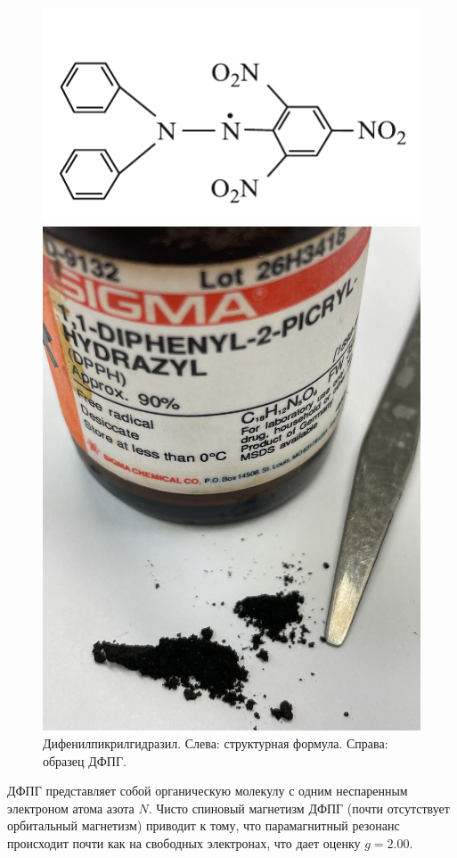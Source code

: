 \documentclass[a4paper, 12pt]{article} %
\begin{document}
	\begin{figure}[h!]
		\centering
		\begin{minipage}{0.6\textwidth}
			\centering
			\includegraphics[width=0.7\linewidth]{res/dfpg_struct.png}
		\end{minipage}%
		\begin{minipage}{0.4\textwidth}
			\centering
			\includegraphics[width=0.7\linewidth]{res/dfpg.jpg}
		\end{minipage}
		\caption{Дифенилпикрилгидразил. Слева: структурная формула. Справа: образец ДФПГ.}
		\label{fig:dfpg}
	\end{figure}
	
	ДФПГ представляет собой органическую молекулу с одним неспаренным электроном атома азота $N$. Чисто спиновый магнетизм ДФПГ (почти отсутствует орбитальный магнетизм) приводит к тому, что парамагнитный резонанс происходит почти как на свободных электронах, что дает оценку $g = 2.00$.
	
\end{document}
